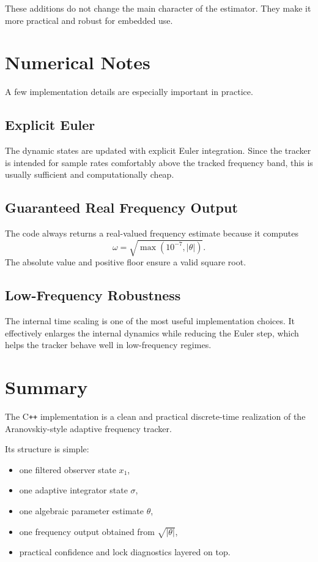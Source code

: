 \documentclass[conference]{IEEEtran}
\begin{document}
These additions do not change the main character of the estimator. They make
it more practical and robust for embedded use.

\section{Numerical Notes}

A few implementation details are especially important in practice.

\subsection{Explicit Euler}

The dynamic states are updated with explicit Euler integration. Since the
tracker is intended for sample rates comfortably above the tracked frequency
band, this is usually sufficient and computationally cheap.

\subsection{Guaranteed Real Frequency Output}

The code always returns a real-valued frequency estimate because it computes
\begin{equation}
  \omega = \sqrt{\max(10^{-7}, |\theta|)}.
\end{equation}
The absolute value and positive floor ensure a valid square root.

\subsection{Low-Frequency Robustness}

The internal time scaling is one of the most useful implementation choices.
It effectively enlarges the internal dynamics while reducing the Euler step,
which helps the tracker behave well in low-frequency regimes.

\section{Summary}

The C\texttt{++} implementation is a clean and practical discrete-time
realization of the Aranovskiy-style adaptive frequency tracker.

Its structure is simple:
\begin{itemize}
  \item one filtered observer state $x_1$,
  \item one adaptive integrator state $\sigma$,
  \item one algebraic parameter estimate $\theta$,
  \item one frequency output obtained from $\sqrt{|\theta|}$,
  \item practical confidence and lock diagnostics layered on top.
\end{itemize}
\end{document}
